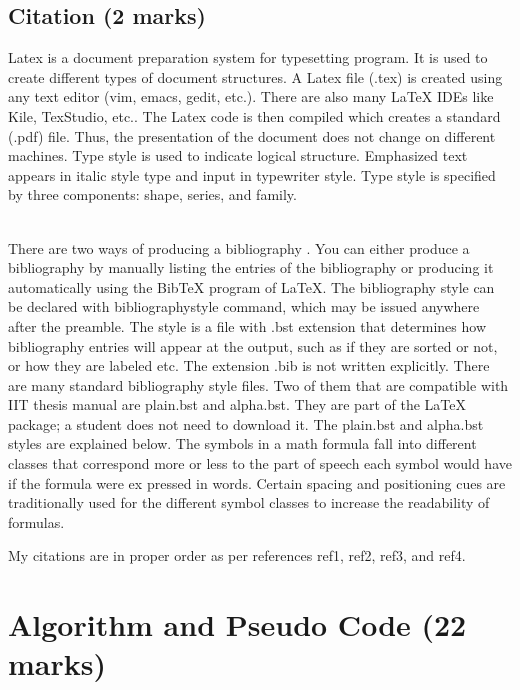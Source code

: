 \documentclass[12pt]{article}
\begin{document}
\subsection{Citation (2 marks)}
Latex \cite{ref1} is a document preparation system for typesetting program. It is used
to create different types of document structures. A Latex file (.tex) is created
using any text editor (vim, emacs, gedit, etc.). There are also many LaTeX
IDEs like Kile, TexStudio, etc.. The Latex code is then compiled which creates
a standard (.pdf) file. Thus, the presentation of the document does not change
on different machines.\newline
Type style \cite{ref2} is used to indicate logical structure. Emphasized text appears in
italic style type and input in typewriter style. Type style is specified by three
components: shape, series, and family.\par\mbox{}\\
There are two ways of producing a bibliography \cite{ref3}. You can either produce
a bibliography by manually listing the entries of the bibliography or producing
it automatically using the BibTeX program of LaTeX. The bibliography style can
be declared with bibliographystyle command, which may be issued anywhere
after the preamble. The style is a file with .bst extension that determines how
bibliography entries will appear at the output, such as if they are sorted or not,
or how they are labeled etc. The extension .bib is not written explicitly. There
are many standard bibliography style files. Two of them that are compatible
with IIT thesis manual are plain.bst and alpha.bst. They are part of the LaTeX
package; a student does not need to download it. The plain.bst and alpha.bst
styles are explained below. The symbols in a math formula fall into different
classes that correspond more or less to the part of speech each symbol would
have if the formula were ex pressed in words. Certain spacing and positioning cues are traditionally used for the different symbol classes to increase the
readability of formulas.\cite{ref4} \par
My citations are in proper order as per references ref1, ref2, ref3, and ref4.
\newpage
\section{Algorithm and Pseudo Code (22 marks)}
\end{document}
